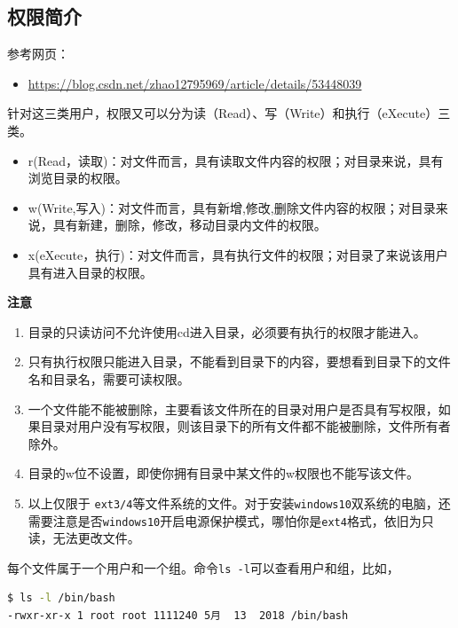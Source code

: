 \documentclass[doctor,openright,twoside]{sjtuthesis}
\providecommand{\tightlist}{%
    \setlength{\itemsep}{0pt}\setlength{\parskip}{0pt}}
\newcommand{\passthrough}[1]{#1}
\theoremstyle{plain}
\theoremstyle{definition}
\theoremstyle{remark}
\theoremstyle{ocrenumbox}
\theoremstyle{plain}
\begin{document}
\subsection{权限简介}

参考网页：

\begin{itemize}
\tightlist
\item
  \url{https://blog.csdn.net/zhao12795969/article/details/53448039}
\end{itemize}

针对这三类用户，权限又可以分为读（Read）、写（Write）和执行（eXecute）三类。

\begin{itemize}
\tightlist
\item
  r(Read，读取)：对文件而言，具有读取文件内容的权限；对目录来说，具有浏览目录的权限。
\item
  w(Write,写入)：对文件而言，具有新增,修改,删除文件内容的权限；对目录来说，具有新建，删除，修改，移动目录内文件的权限。
\item
  x(eXecute，执行)：对文件而言，具有执行文件的权限；对目录了来说该用户具有进入目录的权限。
\end{itemize}

\textbf{注意}

\begin{enumerate}
\def\labelenumi{\arabic{enumi}.}
\tightlist
\item
  目录的只读访问不允许使用cd进入目录，必须要有执行的权限才能进入。
\item
  只有执行权限只能进入目录，不能看到目录下的内容，要想看到目录下的文件名和目录名，需要可读权限。
\item
  一个文件能不能被删除，主要看该文件所在的目录对用户是否具有写权限，如果目录对用户没有写权限，则该目录下的所有文件都不能被删除，文件所有者除外。
\item
  目录的w位不设置，即使你拥有目录中某文件的w权限也不能写该文件。
\item
  以上仅限于
  \passthrough{\lstinline!ext3/4!}等文件系统的文件。对于安装\passthrough{\lstinline!windows10!}双系统的电脑，还需要注意是否\passthrough{\lstinline!windows10!}开启电源保护模式，哪怕你是\passthrough{\lstinline!ext4!}格式，依旧为只读，无法更改文件。
\end{enumerate}

每个文件属于一个用户和一个组。命令\passthrough{\lstinline!ls -l!}可以查看用户和组，比如，

\begin{lstlisting}[language=bash]
$ ls -l /bin/bash 
-rwxr-xr-x 1 root root 1111240 5月  13  2018 /bin/bash
\end{lstlisting}
\end{document}
